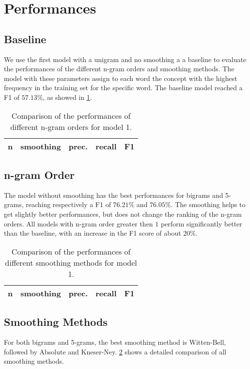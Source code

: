 \section{Performances}
\label{sec:performances}

\subsection{Baseline}
We use the first model with a unigram and no smoothing a a baseline to evaluate the performances of the different n-gram orders and smoothing methods.
The model with these parameters assign to each word the concept with the highest frequency in the training set for the specific word.
The baseline model reached a F1 of $57.13\%$, as showed in \cref{tab:v1-ngrams}. 

\begin{table}[t!]
	\centering
    \begin{tabular}{ l l l l l }
    	\toprule
    		n & smoothing & prec. & recall & F1 \\
    	\midrule
            
    	\bottomrule
	\end{tabular}
    \caption{Comparison of the performances of different n-gram orders for model 1.}
	\label{tab:v1-ngrams}
\end{table}

\subsection{n-gram Order}
The model without smoothing has the best performances for bigrams and 5-grams, reaching respectively a F1 of $76.21\%$  and $76.05\%$.
The smoothing helps to get slightly better performances, but does not change the ranking of the n-gram orders.
All models with n-gram order greater then $1$ perform significantly better than the baseline, with an increase in the F1 score of about $20\%$.

\begin{table}[t!]
	\centering
    \begin{tabular}{ l l l l l }
    	\toprule
    		n & smoothing & prec. & recall & F1 \\
    	\midrule
            
    	\bottomrule
	\end{tabular}
    \caption{Comparison of the performances of different smoothing methods for model 1.}
	\label{tab:v1-smoothing}
\end{table}

\subsection{Smoothing Methods}
For both bigrams and 5-grams, the best smoothing method is Witten-Bell, followed by Absolute and Kneser-Ney.
\cref{tab:v1-smoothing} shows a detailed comparison of all smoothing methods.

